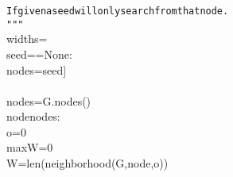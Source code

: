 {{\begin{tabbing}
{\texttt{\hspace{48pt}If\hspace{6pt}given\hspace{6pt}a\hspace{6pt}seed\hspace{6pt}will\hspace{6pt}only\hspace{6pt}search\hspace{6pt}from\hspace{6pt}that\hspace{6pt}node.}}\\
{\texttt{\hspace{24pt}\string"}}{\texttt{\string"\string"}}\\
\hspace{24pt}widths\hspace{6pt}=\hspace{6pt}{[}{]}\\
\hspace{6pt}seed\hspace{6pt}==\hspace{6pt}None:\\
\hspace{48pt}nodes\hspace{6pt}=\hspace{6pt}{[}seed{]}\\
\\
\hspace{48pt}nodes\hspace{6pt}=\hspace{6pt}G.nodes()\\
\hspace{6pt}node\hspace{6pt}nodes:\\
\hspace{48pt}o\hspace{6pt}=\hspace{6pt}0\\
\hspace{48pt}maxW\hspace{6pt}=\hspace{6pt}0\\
\hspace{48pt}W\hspace{6pt}=\hspace{6pt}len(neighborhood(G,node,o))\\

\end{tabbing}}}
